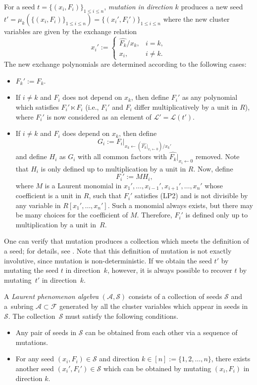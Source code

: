 \documentclass[pdftex]{sigma}
\numberwithin{equation}{section}
\newcommand{\new}[1]{{#1}}
\begin{document}
\begin{Definition}
For a seed $t = \{ (x_i,F_i) \}_{1 \leq i \leq n}$, \emph{mutation in direction $k$} produces a new seed $t' = \mu_k(\{ (x_i,F_i) \}_{1 \leq i \leq n}) = \{ (x_i',F_i') \}_{1 \leq i \leq n}$ where the new cluster variables are given by the exchange relation
 \[
 x_i' := \begin{cases} \hat{F_k}/x_k, & i = k, \\ x_i, & i \neq k. \end{cases}
 \]
The new exchange polynomials are determined according to the following cases:
 \begin{itemize}\itemsep=0pt
 \item $F_k' := F_k$.
 \item If $i \neq k$ and $F_i$ does not depend on $x_k$, then define $F_i'$ as any polynomial which satisfies $F_i' \ltimes F_i$ (i.e., $F_i'$ and $F_i$ differ multiplicatively by a unit in $R$), where $F_i'$ is now considered as an element of $\mathcal{L}' = \mathcal{L}(t')$.
 \item If $i \neq k$ and $F_i$ does depend on $x_k$, then define
 \[ G_i := F_i\big|_{x_k \leftarrow (\hat{F_k}|_{x_i \leftarrow 0})/x_k'} \]
 and define $H_i$ as $G_i$ with all common factors with $ \hat{F_k}\big|_{x_i \leftarrow 0}$ removed. Note that $H_i$ is only defined up to multiplication by a unit in $R$. Now, define
 \[ F_i' := MH_i, \]
 where $M$ is a Laurent monomial in $x_1', \dots, x_{i-1}', x_{i+1}', \dots, x_n'$ whose coefficient is a unit in $R$, such that $F_i'$ satisfies (LP2) and is not divisible by any variable in $R[x_1',\dots,x_n']$. Such a monomial always exists, but there may be many choices for the coefficient of $M$. Therefore, $F_i'$ is defined only up to multiplication by a unit in~$R$.
 \end{itemize}
\end{Definition}
One can verify that mutation produces a collection which meets the definition of a seed; for details, see \cite[Section~2.2]{LP-12}. Note that this definition of mutation is not exactly involutive, since mutation is non-deterministic. If we obtain the seed $t'$ by mutating the seed $t$ in direction~$k$, however, it is always possible to recover $t$ by mutating~$t'$ in direction~$k$.

\begin{Definition}
A \emph{Laurent phenomenon algebra} $(\mathcal{A}, \mathcal{S})$ consists of a collection of seeds $\mathcal{S}$ and a~subring $\mathcal{A} \subset \mathcal{F}$ generated by all the cluster variables which appear in seeds in~$\mathcal{S}$. The collection~$\mathcal{S}$ must satisfy the following conditions.
\begin{itemize}\itemsep=0pt
 \item Any pair of seeds in $\mathcal{S}$ can be obtained from each other via a sequence of mutations.
 \item For any seed $(x_i,F_i) \in \mathcal{S}$ and direction $k \in [n]\new{:=\{1,2,\dots,n\}}$, there exists another seed $(x_i',F_i') \in \mathcal{S}$ which can be obtained by mutating $(x_i,F_i)$ in direction $k$.
\end{itemize}
\end{Definition}
\end{document}
